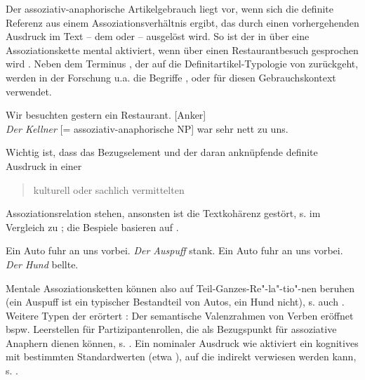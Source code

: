 Der assoziativ-anaphorische  Artikelgebrauch liegt vor, wenn sich die definite Referenz aus einem Assoziationsverhältnis ergibt, das durch einen vorhergehenden Ausdruck im Text -- dem  \parencite[49]{Hawkins1978} oder  \parencite[6]{Cui2014} -- ausgelöst wird. So ist der  in  über eine Assoziationskette mental aktiviert, wenn über einen Restaurantbesuch gesprochen wird \parencite[Beispiel in Anlehnung an][50]{Schwarz2000}. Neben dem Terminus  , der auf die Definitartikel-Typologie von \textcite{Hawkins1978} zurückgeht, werden in der Forschung u.a. die Begriffe   \parencite{Clark1977},  \parencite{Prince1981} oder  \parencite{Schwarz2000} für diesen Gebrauchskontext verwendet.  

\begin{exe}
	\ex \label{ex:asso} Wir besuchten gestern ein Restaurant. [Anker] \\ 
	\textit{Der Kellner} [= assoziativ-anaphorische  NP] war sehr nett zu uns. \end{exe}
\noindent 
Wichtig ist, dass das Bezugselement und der daran anknüpfende definite Ausdruck in einer \blockcquote[36]{Himmelmann1997}{kulturell oder sachlich vermittelten} Assoziationsrelation stehen, ansonsten ist die Textkohärenz gestört, s.  im Vergleich zu ; die Bespiele basieren auf \textcite[123]{Hawkins1978}.

 \begin{exe}
	\ex \label{ex:asso2}   
	\begin{xlist}
		\ex \label{ex:auspuff} Ein Auto fuhr an uns vorbei. \textit{Der Auspuff} stank. 
		\ex \label{ex:hund} Ein Auto fuhr an uns vorbei. \textit{Der Hund} bellte.
		\end{xlist}
\end{exe}

Mentale Assoziationsketten können also auf Teil-Ganzes-Re"-la"-tio"-nen beruhen (ein Auspuff ist ein typischer Bestandteil von Autos, ein Hund nicht), s. auch . Weitere Typen der  erörtert \textcite[98--122]{Schwarz2000}: Der semantische Valenzrahmen von Verben eröffnet bspw. Leerstellen für Partizipantenrollen,  die als Bezugspunkt für assoziative Anaphern dienen können, s. . Ein nominaler Ausdruck wie  aktiviert ein kognitives  mit bestimmten Standardwerten (etwa ), auf die indirekt verwiesen werden kann, s. . 

